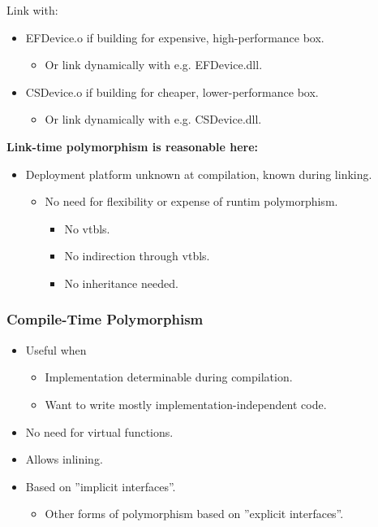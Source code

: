 Link with:
\begin{itemize}
  \item EFDevice.o if building for expensive, high-performance box.
  \begin{itemize}
    \item Or link dynamically with e.g. EFDevice.dll.
  \end{itemize}
  \item CSDevice.o if building for cheaper, lower-performance box.
  \begin{itemize}
    \item Or link dynamically with e.g. CSDevice.dll.
  \end{itemize}
\end{itemize}
\textbf{Link-time polymorphism is reasonable here:}
\begin{itemize}
  \item Deployment platform unknown at compilation, known during linking.
  \begin{itemize}
    \item No need for flexibility or expense of runtim polymorphism.
    \begin{itemize}
      \item No vtbls.
      \item No indirection through vtbls.
      \item No inheritance needed.
    \end{itemize}
  \end{itemize}
\end{itemize}

\subsubsection{Compile-Time Polymorphism}
\begin{itemize}
  \item Useful when
  \begin{itemize}
    \item Implementation determinable during compilation.
    \item Want to write mostly implementation-independent code.
  \end{itemize}
  \item No need for virtual functions.
  \item Allows inlining.
  \item Based on ''implicit interfaces''.
  \begin{itemize}
    \item Other forms of polymorphism based on ''explicit interfaces''.
  \end{itemize}
\end{itemize}

